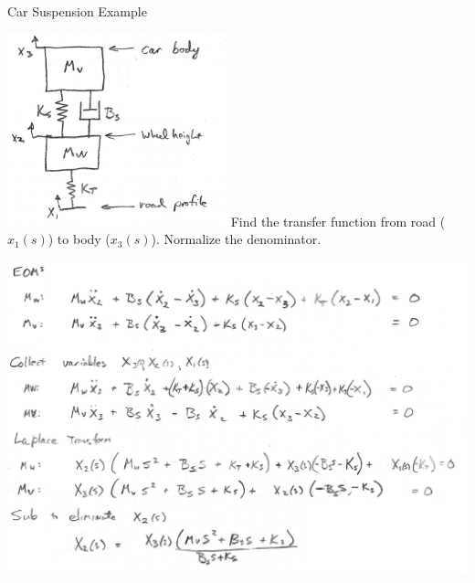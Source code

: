 
\begin{Example}\label{ExampleCarSuspensionTF}   %
Car Suspension Example

\includegraphics[width=2.5in]{figs02/00730a.png}    Find the transfer function from road ($x_1(s)$) to body ($x_3(s)$).
Normalize the denominator.


\includegraphics[width=6.25in]{figs02/00731a.png}

\end{Example}

